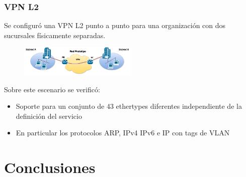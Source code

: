 \documentclass{beamer}
\begin{document}
\begin{frame}
\frametitle{VPN L2} 

Se configur\'o una VPN L2 punto a punto para una organizaci\'on con dos sucursales f\'isicamente separadas.

\begin{figure}[H]
\centering
\includegraphics[width=0.5\textwidth]{imagenes/VPNL2.png}
\end{figure}

Sobre este escenario se verific\'o:
\begin{itemize}
\item Soporte para un conjunto de 43 ethertypes diferentes independiente de la definici\'on del servicio
\item En particular los protocolos ARP, IPv4 IPv6 e IP con tags de VLAN
\end{itemize}


\end{frame}

\section{Conclusiones} 
\frame{\tableofcontents[currentsection]}

%
\end{document}
